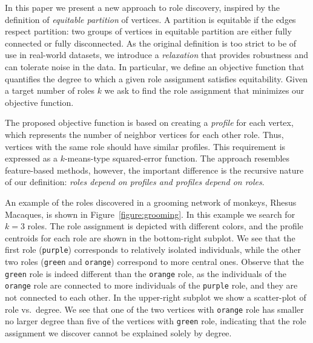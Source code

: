 \iffalse
An attractive definition for 
discovering roles in networks is based on the concept of
\emph{regular equivalence}~\cite{everett1994regular,white1983graph}:
According to regular equivalence, 
two vertices should be assigned to the same role
only if their neighbors have the same roles, ignoring multiplicities.
For example, 
for the collaboration network of a company
we may discover 
that vertices with role $A$ (``project manager'')
are connected to vertices with role 
$B$ (``business analyst'') and $C$ (``s/w developer''), 
while vertices with roles $B$ and $C$ are typically not connected to each other. 
\fi

In this paper we present a new approach to role discovery, 
inspired by the definition of \emph{equitable partition} of vertices.
A partition is equitable if the edges respect partition: 
two groups of vertices in equitable partition are either fully connected or fully disconnected.
As the original definition is too strict to be of use in real-world datasets, 
we introduce a \emph{relaxation} that provides robustness and can tolerate noise in the data.
In particular, we define an objective function that quantifies
the degree to which a given role assignment 
satisfies equitability.
Given a target number of roles $k$
we ask to find the role assignment that minimizes our objective function.



The proposed objective function is based on creating a \emph{profile} for each vertex, 
which represents the number of neighbor vertices for each other role.
Thus, vertices with the same role should have similar profiles.
This requirement is expressed as a $k$-means-type squared-error function. 
The approach resembles feature-based methods,
however, the important difference is the recursive nature of our definition: 
\emph{roles depend on profiles and profiles depend on roles}. 

An example of the roles discovered in a grooming network
of monkeys, Rhesus Macaques, 
is shown in Figure~\ref{figure:grooming}. 
In this example we search for $k=3$ roles. 
The role assignment is depicted with different colors, 
and the profile centroids for each role are shown in the bottom-right subplot.
We see that the first role ({\tt purple}) corresponds to relatively isolated individuals, 
while the other two roles ({\tt green} and {\tt orange}) correspond to more central ones. 
Observe that the {\tt green} role is indeed different than the {\tt orange} role,
as the individuals of the {\tt orange} role are connected to more individuals of the {\tt purple} role, 
and they are not connected to each other. 
In the upper-right subplot we show a scatter-plot of role vs.\ degree. 
We see that one of the two vertices with {\tt orange} role
has smaller no larger degree than five of the vertices with {\tt green} role, 
indicating that the role assignment we discover cannot be explained solely by degree. 

